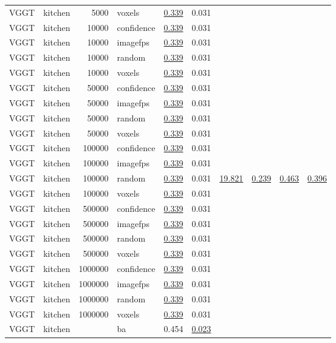\begin{table}[H]
\begin{tabular}{llrlrrrrrr}
VGGT & kitchen & 5000 & voxels & \underline{0.339} & 0.031 &  &  &  &  \\
VGGT & kitchen & 10000 & confidence & \underline{0.339} & 0.031 &  &  &  &  \\
VGGT & kitchen & 10000 & imagefps & \underline{0.339} & 0.031 &  &  &  &  \\
VGGT & kitchen & 10000 & random & \underline{0.339} & 0.031 &  &  &  &  \\
VGGT & kitchen & 10000 & voxels & \underline{0.339} & 0.031 &  &  &  &  \\
VGGT & kitchen & 50000 & confidence & \underline{0.339} & 0.031 &  &  &  &  \\
VGGT & kitchen & 50000 & imagefps & \underline{0.339} & 0.031 &  &  &  &  \\
VGGT & kitchen & 50000 & random & \underline{0.339} & 0.031 &  &  &  &  \\
VGGT & kitchen & 50000 & voxels & \underline{0.339} & 0.031 &  &  &  &  \\
VGGT & kitchen & 100000 & confidence & \underline{0.339} & 0.031 &  &  &  &  \\
VGGT & kitchen & 100000 & imagefps & \underline{0.339} & 0.031 &  &  &  &  \\
VGGT & kitchen & 100000 & random & \underline{0.339} & 0.031 & \underline{19.821} & \underline{0.239} & \underline{0.463} & \underline{0.396} \\
VGGT & kitchen & 100000 & voxels & \underline{0.339} & 0.031 &  &  &  &  \\
VGGT & kitchen & 500000 & confidence & \underline{0.339} & 0.031 &  &  &  &  \\
VGGT & kitchen & 500000 & imagefps & \underline{0.339} & 0.031 &  &  &  &  \\
VGGT & kitchen & 500000 & random & \underline{0.339} & 0.031 &  &  &  &  \\
VGGT & kitchen & 500000 & voxels & \underline{0.339} & 0.031 &  &  &  &  \\
VGGT & kitchen & 1000000 & confidence & \underline{0.339} & 0.031 &  &  &  &  \\
VGGT & kitchen & 1000000 & imagefps & \underline{0.339} & 0.031 &  &  &  &  \\
VGGT & kitchen & 1000000 & random & \underline{0.339} & 0.031 &  &  &  &  \\
VGGT & kitchen & 1000000 & voxels & \underline{0.339} & 0.031 &  &  &  &  \\
VGGT & kitchen &  & ba & 0.454 & \underline{0.023} &  &  &  &  \\

\end{tabular}
\end{table}
